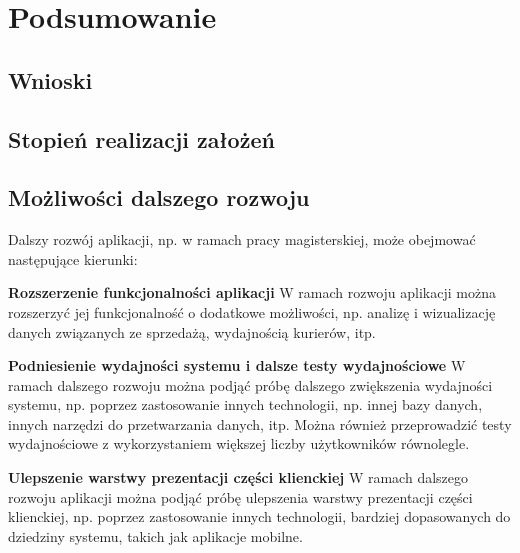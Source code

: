 \clearpage %

\section{Podsumowanie}

\subsection{Wnioski}

\subsection{Stopień realizacji założeń}

\subsection{Możliwości dalszego rozwoju}

Dalszy rozwój aplikacji, np. w ramach pracy magisterskiej, może obejmować następujące kierunki:

\textbf{Rozszerzenie funkcjonalności aplikacji} W ramach rozwoju aplikacji można rozszerzyć jej funkcjonalność o dodatkowe możliwości, np. analizę i wizualizację danych związanych ze sprzedażą, wydajnością kurierów, itp.

\textbf{Podniesienie wydajności systemu i dalsze testy wydajnościowe} W ramach dalszego rozwoju można podjąć próbę dalszego zwiększenia wydajności systemu, np. poprzez zastosowanie innych technologii, np. innej bazy danych, innych narzędzi do przetwarzania danych, itp. Można również przeprowadzić testy wydajnościowe z wykorzystaniem większej liczby użytkowników równolegle.

\textbf{Ulepszenie warstwy prezentacji części klienckiej} W ramach dalszego rozwoju aplikacji można podjąć próbę ulepszenia warstwy prezentacji części klienckiej, np. poprzez zastosowanie innych technologii, bardziej dopasowanych do dziedziny systemu, takich jak aplikacje mobilne. 
